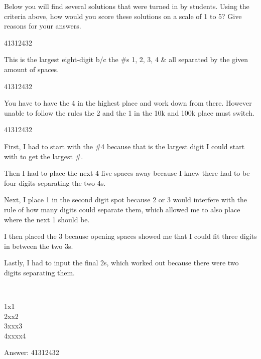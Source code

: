 \begin{thinkpair*}
Below you will find several solutions that were turned in by students.  Using the criteria above, how would you score these solutions on a scale of 1 to 5?  Give reasons for your answers.
\end{thinkpair*}

\begin{sol*}[Solution 1]
41312432


This is the largest eight-digit b/c  the \#s 1, 2, 3, 4 \& all separated by the given amount of spaces.

\end{sol*}


\begin{sol*}[Solution 2]
41312432


You have to have the 4 in the highest place and work down from there.  However unable to follow the rules the 2 and the 1 in the 10k and 100k place must switch.

\end{sol*}


\begin{sol*}[Solution 3]
41312432


First, I had to start with the \#4 because that is the largest digit I could start with to get the largest \#.



Then I had to place the next 4 five spaces away because I knew there had to be four digits separating the two 4s.


Next, I place 1 in the second digit spot because 2 or 3 would interfere with the rule of how many digits could separate them, which allowed me to also place where the next 1 should be.


I then placed the 3 because opening spaces showed me that I could fit three digits in between the two 3s.


Lastly, I had to input the final 2s, which worked out because there were two digits separating them.

\end{sol*}


\begin{sol*}[Solution 4]\ 

1x1\\

2xx2\\

3xxx3\\

4xxxx4



Answer: 41312432

\end{sol*}


